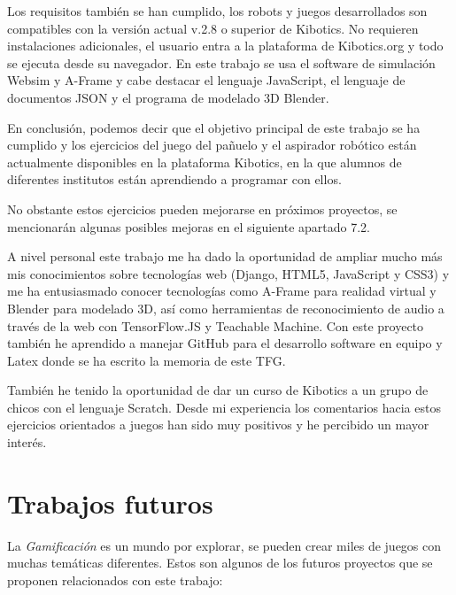 Los requisitos  también se han cumplido, los robots y juegos desarrollados son compatibles con la versión actual v.2.8 o superior de Kibotics. No requieren instalaciones adicionales, el usuario entra a la plataforma de Kibotics.org y todo se ejecuta desde su navegador.  En este trabajo se usa el software de simulación Websim y A-Frame y cabe destacar el lenguaje JavaScript, el lenguaje de documentos JSON y el programa de modelado 3D Blender.

En conclusión,  podemos decir que el objetivo principal de este trabajo se ha cumplido y los ejercicios del juego del pañuelo y el aspirador robótico están actualmente disponibles en la plataforma Kibotics, en la que alumnos de diferentes institutos están aprendiendo a programar con ellos.

No obstante estos ejercicios pueden mejorarse en próximos proyectos, se mencionarán algunas posibles mejoras en el siguiente apartado 7.2.

A nivel personal este trabajo me ha dado la oportunidad de ampliar mucho más mis conocimientos sobre tecnologías web (Django, HTML5, JavaScript y CSS3) y me ha entusiasmado conocer tecnologías como A-Frame para realidad virtual y Blender para modelado 3D, así como herramientas de reconocimiento de audio a través de la web con TensorFlow.JS y Teachable Machine.
Con este proyecto también he aprendido a manejar GitHub para el desarrollo software en equipo y Latex donde se ha escrito la memoria de este TFG.

También he tenido la oportunidad de dar un curso de Kibotics a un grupo de chicos con el lenguaje Scratch. Desde mi experiencia los comentarios hacia estos ejercicios orientados a juegos han sido muy positivos y he percibido un mayor interés.

    
\section{Trabajos futuros}

La \textit{Gamificación} es un mundo por explorar, se pueden crear miles de juegos con muchas temáticas diferentes. Estos son algunos de los futuros proyectos que se proponen relacionados con este trabajo:

